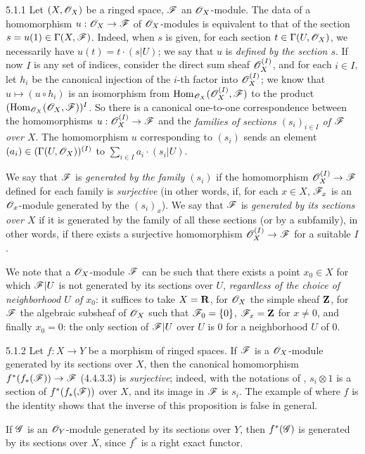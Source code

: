 \begin{env}{5.1.1}
\label{env-0.5.1.1}
Let $(X,\mathscr{O}_X)$ be a ringed space, $\mathscr{F}$ an $\mathscr{O}_X$-module. The data of a homomorphism
$u:\mathscr{O}_X\to\mathscr{F}$ of $\mathscr{O}_X$-modules is equivalent to that of the section
$s=u(1)\in\Gamma(X,\mathscr{F})$. Indeed, when $s$ is given, for each section
$t\in\Gamma(U,\mathscr{O}_X)$, we necessarily have $u(t)=t\cdot(s|U)$; we say that $u$ is
\emph{defined by the section $s$}. If now $I$ is any set of indices, consider the direct
sum sheaf $\mathscr{O}_X^{(I)}$, and for each $i\in I$, let $h_i$ be the canonical injection of
the $i$-th factor into $\mathscr{O}_X^{(I)}$; we know that $u\mapsto(u\circ h_i)$ is an isomorphism
from ${\mathop{\mathrm{Hom}}\nolimits}_{\mathscr{O}_X}(\mathscr{O}_X^{(I)},\mathscr{F})$ to the product $({\mathop{\mathrm{Hom}}\nolimits}_{\mathscr{O}_X}(\mathscr{O}_X,\mathscr{F}))^I$. So
there is a canonical one-to-one correspondence between the homomorphisms
$u:\mathscr{O}_X^{(I)}\to\mathscr{F}$ and the \emph{families of sections $(s_i)_{i\in I}$ of $\mathscr{F}$ over
$X$}. The homomorphism $u$ corresponding to $(s_i)$ sends an element
$(a_i)\in(\Gamma(U,\mathscr{O}_X))^{(I)}$ to $\sum_{i\in I}a_i\cdot(s_i|U)$.

We say that $\mathscr{F}$ is \emph{generated by the family $(s_i)$} if the homomorphism
$\mathscr{O}_X^{(I)}\to\mathscr{F}$ defined
for each family is \emph{surjective} (in other words, if, for each $x\in X$, $\mathscr{F}_x$ is an
$\mathscr{O}_x$-module generated by the $(s_i)_x$). We say that $\mathscr{F}$ is \emph{generated by its
sections over $X$} if it is generated by the family of all these sections (or by a
subfamily), in other words, if there exists a surjective homomorphism $\mathscr{O}_X^{(I)}\to\mathscr{F}$
for a suitable $I$.

We note that a $\mathscr{O}_X$-module $\mathscr{F}$ can be such that there exists a point $x_0\in X$ for
which $\mathscr{F}|U$ is not generated by its sections over $U$, \emph{regardless of the choice
of neighborhood $U$ of $x_0$}: it suffices to take $X=\mathbf{R}$, for $\mathscr{O}_X$ the simple sheaf
$\mathbf{Z}$, for $\mathscr{F}$ the algebraic subsheaf of $\mathscr{O}_X$ such that $\mathscr{F}_0=\{0\}$,
$\mathscr{F}_x=\mathbf{Z}$ for $x\neq 0$, and finally $x_0=0$: the only section of $\mathscr{F}|U$ over $U$
is $0$ for a neighborhood $U$ of $0$.
\end{env}

\begin{env}{5.1.2}
\label{env-0.5.1.2}
Let $f:X\to Y$ be a morphism of ringed spaces. If $\mathscr{F}$ is a $\mathscr{O}_X$-module generated by
its sections over $X$, then the canonical homomorphism $f^*(f_*(\mathscr{F}))\to\mathscr{F}$ (4.4.3.3)
is \emph{surjective}; indeed, with the notations of , $s_i\otimes 1$ is a
section of $f^*(f_*(\mathscr{F}))$ over $X$, and its image in $\mathscr{F}$ is $s_i$. The example of
 where $f$ is the identity shows that the inverse of this proposition is
false in general.

If $\mathscr{G}$ is an $\mathscr{O}_Y$-module generated by its sections over $Y$, then $f^*(\mathscr{G})$ is
generated by its sections over $X$, since $f^*$ is a right exact functor.
\end{env}

